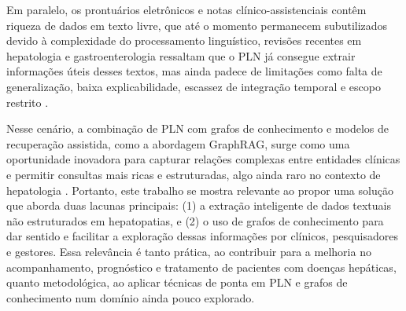 Em paralelo, os prontuários eletrônicos e notas clínico-assistenciais contêm riqueza de dados em texto livre, que até o momento permanecem subutilizados devido à complexidade do processamento linguístico, revisões recentes em hepatologia e gastroenterologia ressaltam que o PLN já consegue extrair informações úteis desses textos, mas ainda padece de limitações como falta de generalização, baixa explicabilidade, escassez de integração temporal e escopo restrito \citep{omar2025}.

Nesse cenário, a combinação de PLN com grafos de conhecimento e modelos de recuperação assistida, como a abordagem GraphRAG, surge como uma oportunidade inovadora para capturar relações complexas entre entidades clínicas e permitir consultas mais ricas e estruturadas, algo ainda raro no contexto de hepatologia \citep{stammers2025}. Portanto, este trabalho se mostra relevante ao propor uma solução que aborda duas lacunas principais: (1) a extração inteligente de dados textuais não estruturados em hepatopatias, e (2) o uso de grafos de conhecimento para dar sentido e facilitar a exploração dessas informações por clínicos, pesquisadores e gestores. Essa relevância é tanto prática, ao contribuir para a melhoria no acompanhamento, prognóstico e tratamento de pacientes com doenças hepáticas, quanto metodológica, ao aplicar técnicas de ponta em PLN e grafos de conhecimento num domínio ainda pouco explorado.


